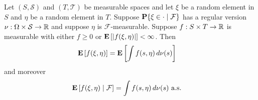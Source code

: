 \begin{thm}\label{Disintegration}Let $(S, \mathcal{S})$ and $(T, \mathcal{T})$ be measurable
  spaces and let $\xi$ be a random element in $S$ and $\eta$ be a
  random element in $T$.  Suppose $\cprobability{\mathcal{F}}{\xi \in
    \cdot}$ has a regular version $\nu : \Omega \times \mathcal{S} \to
  \reals$ and suppose $\eta$ is
  $\mathcal{F}$-measurable.  Suppose $f : S \times T \to \reals$ is
  measurable with either $f \geq 0$ or $\expectation{\abs{f(\xi, \eta)}}< \infty$.  Then 
\begin{align*}
\expectation{f(\xi, \eta)} &= \expectation{\int f(s, \eta) \, d\nu(s)}
\end{align*}
and moreover
\begin{align*}
\cexpectationlong{\mathcal{F}}{f(\xi, \eta)} &= \int f(s, \eta) \, d\nu(s)
\text{ a.s.}
\end{align*}
\end{thm}
